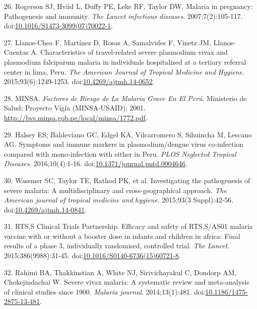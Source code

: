 \documentclass[]{article}
\begin{document}
\hypertarget{ref-rogerson2007preg}{}
26. Rogerson SJ, Hviid L, Duffy PE, Leke RF, Taylor DW. Malaria in
pregnancy: Pathogenesis and immunity. \emph{The Lancet infectious
diseases}. 2007;7(2):105-117.
doi:\href{https://doi.org/10.1016/S1473-3099(07)70022-1}{10.1016/S1473-3099(07)70022-1}.

\hypertarget{ref-llanoschea2015}{}
27. Llanos-Chea F, Martínez D, Rosas A, Samalvides F, Vinetz JM,
Llanos-Cuentas A. Characteristics of travel-related severe plasmodium
vivax and plasmodium falciparum malaria in individuals hospitalized at a
tertiary referral center in lima, Peru. \emph{The American Journal of
Tropical Medicine and Hygiene}. 2015;93(6):1249-1253.
doi:\href{https://doi.org/10.4269/ajtmh.14-0652}{10.4269/ajtmh.14-0652}.

\hypertarget{ref-factores2001}{}
28. MINSA. \emph{Factores de Riesgo de La Malaria Grave En El Perú}.
Ministerio de Salud: Proyecto Vigía (MINSA-USAID); 2001.
\url{http://bvs.minsa.gob.pe/local/minsa/1772.pdf}.

\hypertarget{ref-baldevi2016}{}
29. Halsey ES, Baldeviano GC, Edgel KA, Vilcarromero S, Sihuincha M,
Lescano AG. Symptoms and immune markers in plasmodium/dengue virus
co-infection compared with mono-infection with either in Peru.
\emph{PLOS Neglected Tropical Diseases}. 2016;10(4):1-16.
doi:\href{https://doi.org/10.1371/journal.pntd.0004646}{10.1371/journal.pntd.0004646}.

\hypertarget{ref-wassmer2015}{}
30. Wassmer SC, Taylor TE, Rathod PK, et al. Investigating the
pathogenesis of severe malaria: A multidisciplinary and
cross-geographical approach. \emph{The American journal of tropical
medicine and hygiene}. 2015;93(3 Suppl):42-56.
doi:\href{https://doi.org/10.4269/ajtmh.14-0841}{10.4269/ajtmh.14-0841}.

\hypertarget{ref-rts2015}{}
31. RTS,S Clinical Trials Partnership. Efficacy and safety of RTS,S/AS01
malaria vaccine with or without a booster dose in infants and children
in africa: Final results of a phase 3, individually randomised,
controlled trial. \emph{The Lancet}. 2015;386(9988):31-45.
doi:\href{https://doi.org/10.1016/S0140-6736(15)60721-8}{10.1016/S0140-6736(15)60721-8}.

\hypertarget{ref-rahimi2014meta}{}
32. Rahimi BA, Thakkinstian A, White NJ, Sirivichayakul C, Dondorp AM,
Chokejindachai W. Severe vivax malaria: A systematic review and
meta-analysis of clinical studies since 1900. \emph{Malaria journal}.
2014;13(1):481.
doi:\href{https://doi.org/10.1186/1475-2875-13-481}{10.1186/1475-2875-13-481}.
\end{document}
